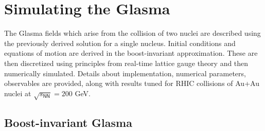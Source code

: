 \setchapterpreamble[u]{\margintoc}
\chapter{Simulating the Glasma}

\begin{preview}[]
The Glasma fields which arise from the collision of two nuclei are described using the previously derived solution for a single nucleus. Initial conditions and equations of motion are derived in the boost-invariant approximation. These are then discretized using principles from real-time lattice gauge theory and then numerically simulated. Details about implementation, numerical parameters, observables are provided, along with results tuned for {\sffamily RHIC} collisions of {\sffamily Au+Au} nuclei at $\sqrt{s_\textsf{NN}}=200$ GeV.  
\end{preview}

\section{Boost-invariant Glasma}

